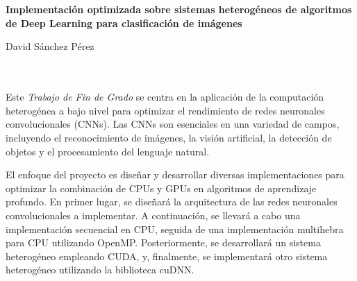 \chapter*{}






\cleardoublepage
\thispagestyle{empty}

\begin{center}
{\large\bfseries Implementación optimizada sobre sistemas heterogéneos de algoritmos de Deep Learning para clasificación de imágenes}\\
\end{center}
\begin{center}
David Sánchez Pérez\\
\end{center}

\\

\vspace{0.7cm}
\\

Este \textit{Trabajo de Fin de Grado} se centra en la aplicación de la computación heterogénea a bajo nivel para optimizar el rendimiento de redes neuronales convolucionales (CNNs). Las CNNs son esenciales en una variedad de campos, incluyendo el reconocimiento de imágenes, la visión artificial, la detección de objetos y el procesamiento del lenguaje natural. 

El enfoque del proyecto es diseñar y desarrollar diversas implementaciones para optimizar la combinación de CPUs y GPUs en algoritmos de aprendizaje profundo. En primer lugar, se diseñará la arquitectura de las redes neuronales convolucionales a implementar. A continuación, se llevará a cabo una implementación secuencial en CPU, seguida de una implementación multihebra para CPU utilizando OpenMP. Posteriormente, se desarrollará un sistema heterogéneo empleando CUDA, y, finalmente, se implementará otro sistema heterogéneo utilizando la biblioteca cuDNN.

